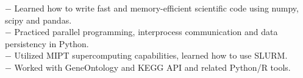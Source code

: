 \documentclass[11pt]{res}
\begin{document}
\begin{resume}
$ - $ Learned how to write fast and memory-efficient scientific code using numpy, scipy and pandas.\\
$ - $ Practiced parallel programming, interprocess communication and data persistency in Python.\\ 
$ - $ Utilized MIPT supercomputing capabilities, learned how to use SLURM.\\
$ - $ Worked with GeneOntology and KEGG API and related Python/R tools.\vspace{0.2em}


\end{resume}
\end{document}
